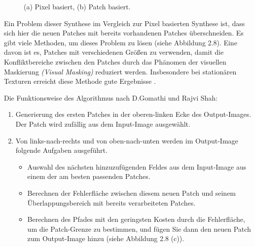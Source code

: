 \documentclass[12pt, a4paper,twoside,openany]{report} %
\begin{document}
\begin{figure}[H]
    \centering
    \qquad
    \caption{(a) Pixel basiert, (b) Patch basiert.}%
\end{figure}

Ein Problem dieser Synthese im Vergleich zur Pixel basierten Synthese ist, dass sich hier die neuen Patches mit bereits vorhandenen Patches überschneiden.
Es gibt viele Methoden, um dieses Problem zu lösen {(siehe Abbildung 2.8)}.
Eine davon ist es, Patches mit verschiedenen Größen zu verwenden, damit die Konfliktbereiche zwischen den Patches durch das Phänomen der visuellen Maskierung
\textit{(Visual Masking)} reduziert werden.
Insbesondere bei stationären Texturen erreicht diese Methode gute Ergebnisse \cite{EfrosQuilt}.

Die Funktionsweise des Algorithmus nach D.Gomathi und Rajvi Shah:

\begin{enumerate}
    \item Generierung des ersten Patches in der oberen-linken Ecke des Output-Images. Der Patch wird zufällig aus dem Input-Image ausgewählt.
    \item Von links-nach-rechts und von oben-nach-unten werden im Output-Image folgende Aufgaben ausgeführt.
    \begin{itemize}
        \item Auswahl des nächsten hinzuzufügenden Feldes aus dem Input-Image aus einem der am besten passenden Patches.
        \item Berechnen der Fehlerfläche zwischen diesem neuen Patch und seinem Überlappungsbereich mit bereits
        verarbeiteten Patches.
        \item Berechnen des Pfades mit den geringsten Kosten durch die Fehlerfläche, um die Patch-Grenze zu bestimmen, und fügen Sie dann den neuen Patch zum Output-Image hinzu {(siehe Abbildung 2.8 (c))}.
    \end{itemize}
\end{enumerate}
\end{document}
